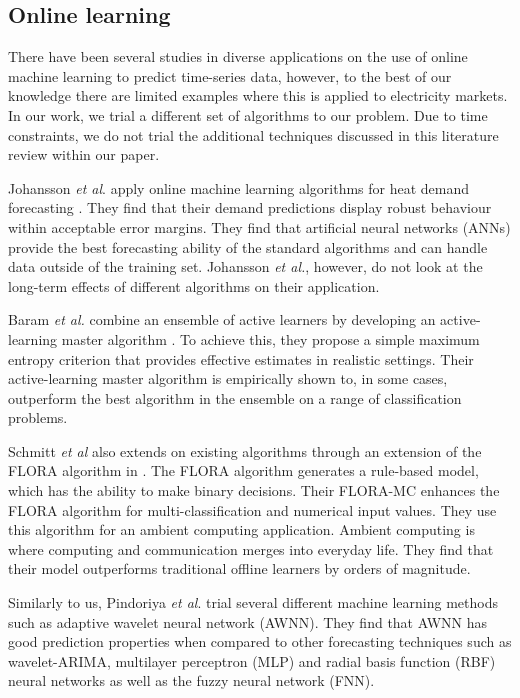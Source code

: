 \subsection{Online learning}

There have been several studies in diverse applications on the use of online machine learning to predict time-series data, however, to the best of our knowledge there are limited examples where this is applied to electricity markets. In our work, we trial a different set of algorithms to our problem. Due to time constraints, we do not trial the additional techniques discussed in this literature review within our paper. 

Johansson \textit{et al}. apply online machine learning algorithms for heat demand forecasting \cite{Johansson2017}. They find that their demand predictions display robust behaviour within acceptable error margins. They find that artificial neural networks (ANNs) provide the best forecasting ability of the standard algorithms and can handle data outside of the training set. Johansson \textit{et al.}, however, do not look at the long-term effects of different algorithms on their application.

Baram \textit{et al.} combine an ensemble of active learners by developing an active-learning master algorithm \cite{Baram2003}. To achieve this, they propose a simple maximum entropy criterion that provides effective estimates in realistic settings. Their active-learning master algorithm is empirically shown to, in some cases, outperform the best algorithm in the ensemble on a range of classification problems.

Schmitt \textit{et al} also extends on existing algorithms through an extension of the FLORA algorithm in \cite{Schmitt2008, Widmer1996}. The FLORA algorithm generates a rule-based model, which has the ability to make binary decisions. Their FLORA-MC enhances the FLORA algorithm for multi-classification and numerical input values. They use this algorithm for an ambient computing application. Ambient computing is where computing and communication merges into everyday life. They find that their model outperforms traditional offline learners by orders of magnitude.

Similarly to us, Pindoriya \textit{et al}. trial several different machine learning methods such as adaptive wavelet neural network (AWNN). They find that AWNN has good prediction properties when compared to other forecasting techniques such as wavelet-ARIMA, multilayer perceptron (MLP) and radial basis function (RBF) neural networks as well as the fuzzy neural network (FNN).


